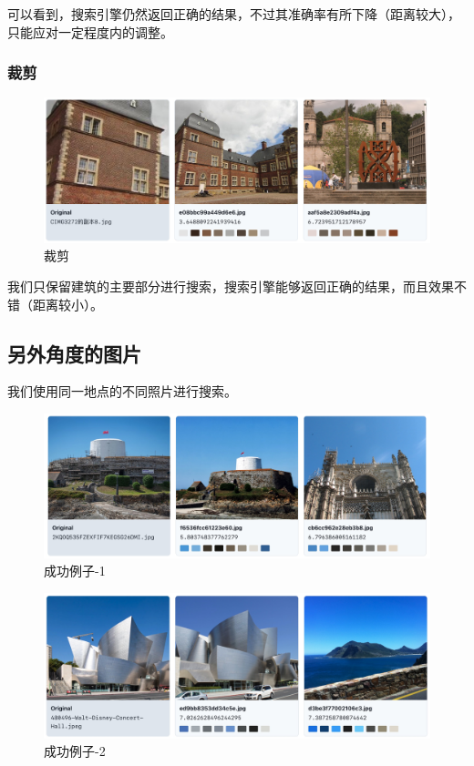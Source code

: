 \documentclass[a4paper]{article}
\begin{document}
可以看到，搜索引擎仍然返回正确的结果，不过其准确率有所下降（距离较大），只能应对一定程度内的调整。

\subsubsection{裁剪}

\begin{figure}[H]
    \centering
    \includegraphics[width=\textwidth]{assets/test-1-4.jpg}
    \caption{裁剪}
    \label{fig:search_result_1_4}
\end{figure}

我们只保留建筑的主要部分进行搜索，搜索引擎能够返回正确的结果，而且效果不错（距离较小）。

\subsection{另外角度的图片}

我们使用同一地点的不同照片进行搜索。

\begin{figure}[H]
    \centering
    \includegraphics[width=\textwidth]{assets/test-2-1.jpg}
    \caption{成功例子-1}
    \label{fig:search_result_2_1}
\end{figure}

\begin{figure}[H]
    \centering
    \includegraphics[width=\textwidth]{assets/test-2-2.jpg}
    \caption{成功例子-2}
    \label{fig:search_result_2_2}
\end{figure}
\end{document}
